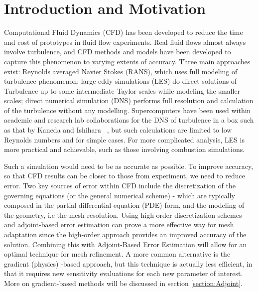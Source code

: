 \section{Introduction and Motivation}

Computational Fluid Dynamics (CFD) has been developed to reduce the time and cost of prototypes in fluid flow experiments. Real fluid flows almost always involve turbulence, and CFD methods and models have been developed to capture this phenomenon to varying extents of accuracy. Three main approaches exist: Reynolds averaged Navier Stokes (RANS), which uses full modeling of turbulence phenomenon; large eddy simulations (LES) do direct solutions of Turbulence up to some intermediate Taylor scales while modeling the smaller scales; direct numerical simulation (DNS) performs full resolution and calculation of the turbulence without any modelling. Supercomputers have been used within academic and research lab collaborations for the DNS of turbulence in a box such as that by Kaneda and Ishihara ~\cite{kaneda:2006}, but such calculations are limited to low Reynolds numbers and for simple cases. For more complicated analysis, LES is more practical and achievable, such as those involving combustion simulations.\par 

Such a simulation would need to be as accurate as possible. To improve accuracy, so that CFD results can be closer to those from experiment, we need to reduce error. Two  key sources of error within CFD include the discretization of the governing equations (or the general numerical scheme) - which are typically composed in the partial differential equation (PDE) form, and the modeling of the geometry, i.e the mesh resolution. Using high-order discretization schemes and adjoint-based error estimation can prove a more effective way for mesh adaptation since the high-order approach provides an improved accuracy of the solution. Combining this with Adjoint-Based Error Estimation will allow for an optimal technique for mesh refinement. A more common alternative is the gradient (physics) -based approach, but this technique is actually less efficient, in that it requires new sensitivity evaluations for each new parameter of interest. More on gradient-based methods will be discussed in section \ref{section:Adjoint}. \par 